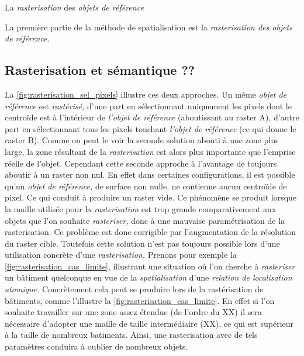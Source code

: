 La \emph{rasterisation} des \emph{objets de référence}

La première partie de la méthode de spatialisation est la
\emph{rasterisation des objets de référence.}



\subsection{Rasterisation et sémantique ??}



La \autoref{fig:rasterisation_sel_pixels} illustre ces deux approches. Un même \emph{objet de référence} est \emph{rastérisé,} d'une part en sélectionnant uniquement les pixels dont le centroïde est à l'intérieur de \emph{l'objet de référence} (aboutissant au raster \textcolor{RdBu-9-1}{\textsf{A}}), d'autre part en sélectionnant tous les pixels touchant \emph{l'objet de référence} (ce qui donne le raster \textcolor{RdBu-9-9}{\textsf{B}}). Comme on peut le voir la seconde solution abouti à une zone plus large, la zone résultant de la \emph{rasterisation} est alors plus importante que l'emprise réelle de l'objet. Cependant cette seconde approche à l'avantage de toujours aboutir à un raster non nul. En effet dans certaines configurations, il est possible qu'un \emph{objet de référence,} de surface non nulle, ne contienne aucun centroïde de pixel. Ce qui conduit à produire un raster vide. Ce phénomène se produit lorsque la maille utilisée pour la \emph{rasterisation} est trop grande comparativement aux objets que l'on souhaite \emph{rasteriser,} donc à une mauvaise paramétrisation de la rasterisation. Ce problème est donc corrigible par l'augmentation de la résolution du raster cible. Toutefois cette solution n'est pas toujours possible lors d'une utilisation concrète d'une \emph{rasterisation.} Prenons pour exemple la \autoref{fig:rasterisation_cas_limite}, illustrant une situation où l'on cherche à \emph{rasteriser} un bâtiment quelconque en vue de la \emph{spatialisation} d'une \emph{relation de localisation atomique.} Concrètement cela peut se produire lors de la rastérisation de bâtiments, comme l'illustre la \autoref{fig:rasterisation_cas_limite}. En effet si l'on souhaite travailler sur une zone assez étendue (de l'ordre du XX) il sera nécessaire d'adopter une maille de taille intermédiaire (XX), ce qui est supérieur à la taille de nombreux batiments. Ainsi, une rasterisation avec de tels paramètres conduira à oublier de nombreux objets.


